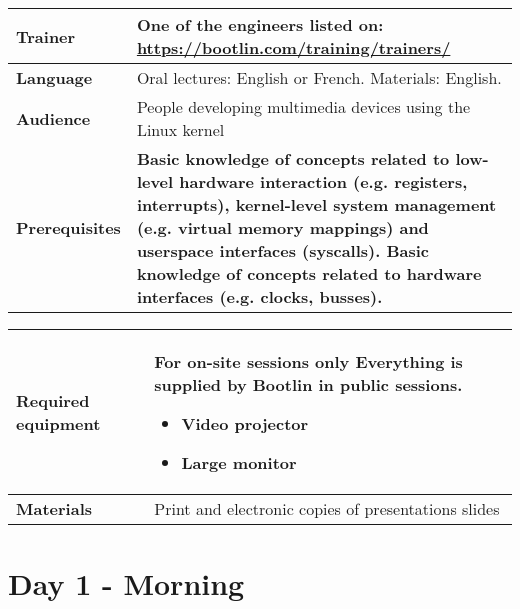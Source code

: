 \documentclass[a4paper,12pt,obeyspaces,spaces,hyphens]{article}
\begin{document}
{\begin{tabularx}{\textwidth}{|g|h|}
    {\bf Trainer} & One of the engineers listed on:
    \newline \url{https://bootlin.com/training/trainers/}\\
    \hline

    {\bf Language} & Oral lectures: English or French.
    \newline Materials: English.\\
    \hline

    {\bf Audience} & People developing multimedia devices using the Linux kernel\\
    \hline

    {\bf Prerequisites} &
    {\bf Basic knowledge of concepts related to low-level hardware interaction
    (e.g. registers, interrupts), kernel-level system management (e.g. virtual
    memory mappings) and userspace interfaces (syscalls).
    Basic knowledge of concepts related to hardware interfaces
    (e.g. clocks, busses).}\\
    \hline

  \end{tabularx}

  \begin{tabularx}{\textwidth}{|g|h|}
    {\bf Required equipment} &
    {\bf For on-site sessions only}
    \newline Everything is supplied by Bootlin in public sessions.
    \begin{itemize}
    \item Video projector
    \item Large monitor
    \end{itemize}\\
    \hline

    {\bf Materials} & Print and electronic copies of presentations slides\\
    \hline

\end{tabularx}}
\normalsize

\section{Day 1 - Morning}
\end{document}
